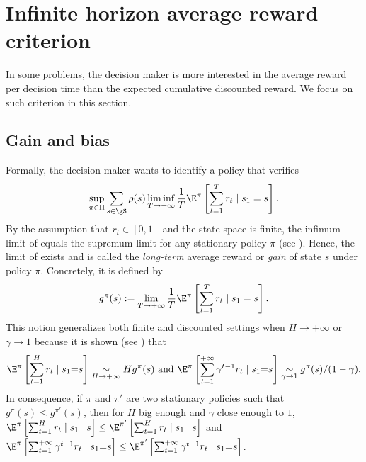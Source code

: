 \section{Infinite horizon average reward criterion}
\label{ch:mdp:sec:gain}

In some problems, the decision maker is more interested in the average reward per decision time than the expected cumulative discounted reward.
We focus on such criterion in this section.

\subsection{Gain and bias}

Formally, the decision maker wants to identify a policy that verifies
\begin{equation}
    \label{eq:avg_obj}
    \sup_{\pi\in\Pi}\sum_{s\in\gS}\rho(s)\liminf_{T\to+\infty}\frac1T \E^\pi\left[ \sum_{t=1}^{T} r_t \mid s_1=s\right].
\end{equation}
By the assumption that $r_t\in[0,1]$ and the state space is finite, the infimum limit of  equals the supremum limit for any stationary policy $\pi$ (see \cite[Chapter~8]{puterman2014markov}).
Hence, the limit of  exists and is called the \emph{long-term} average reward or \emph{gain} of state $s$ under policy $\pi$.
Concretely, it is defined by
\begin{equation}
    \label{eq:gain_defn}
    g^\pi(s) := \lim_{T\to+\infty}\frac1T \E^\pi\left[ \sum_{t=1}^{T} r_t \mid s_1=s\right].
\end{equation}
This notion generalizes both finite and discounted settings when $H\to+\infty$ or $\gamma\to1$ because it is shown (see \cite[Sections~8.2.1 and 8.2.2]{puterman2014markov}) that 
\begin{align*}
    \E^\pi\left[\sum_{t=1}^H r_t\mid s_1{=}s\right] \underset{H\to+\infty}{\sim} Hg^\pi(s) \text{ and }
    \E^\pi\left[\sum_{t=1}^{+\infty} \gamma^{t-1}r_t \mid s_1{=}s\right] \underset{\gamma\to1}{\sim}
    g^\pi(s)/(1-\gamma).
\end{align*}
In consequence, if $\pi$ and $\pi'$ are two stationary policies such that $g^\pi(s)\le g^{\pi'}(s)$, then for $H$ big enough and $\gamma$ close enough to $1$, $\E^\pi\left[\sum_{t=1}^H r_t\mid s_1{=}s\right]\le \E^{\pi'}\left[\sum_{t=1}^H r_t\mid s_1{=}s\right]$ and $\E^\pi\left[\sum_{t=1}^{+\infty} \gamma^{t-1}r_t \mid s_1{=}s\right]\le \E^{\pi'}\left[\sum_{t=1}^{+\infty} \gamma^{t-1}r_t \mid s_1{=}s\right]$.

